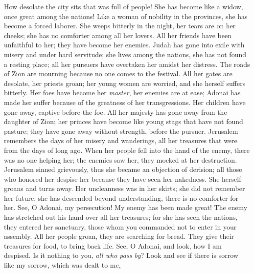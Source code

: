 
\begin{biblechapter} %
 How desolate the city sits 
that was full of people! 
She has become like a widow, 
once great among the nations! 
Like a woman of nobility in the provinces, 
she has become a forced laborer.
\verse She weeps bitterly in the night, 
her tears are on her cheeks; 
she has no comforter 
among all her lovers. 
All her friends have been unfaithful to her; 
they have become her enemies.
\verse Judah has gone into exile with misery 
and under hard servitude; 
she lives among the nations, 
she has not found a resting place; 
all her pursuers have overtaken her 
amidst her distress.
\verse The roads of Zion are mourning 
because no one comes to the festival. 
All her gates are desolate, 
her priests groan; 
her young women are worried, 
and she herself suffers bitterly.
\verse Her foes have become her \textit{master}, 
her enemies are at ease; 
Adonai has made her suffer 
because of the greatness of her transgressions. 
Her children have gone away, 
captive before the foe.
\verse All her majesty has gone away 
from the daughter of Zion; 
her princes have become like young stags 
that have not found pasture; 
they have gone away without strength, 
before the pursuer.
\verse Jerusalem remembers 
the days of her misery and wanderings, 
all her treasures 
that were from the days of long ago. 
When her people fell into the hand of the enemy, 
there was no one helping her; 
the enemies saw her, they mocked 
at her destruction.
\verse Jerusalem sinned grievously, 
thus she became an objection of derision; 
all those who honored her despise her 
because they have seen her nakedness. 
She herself groans 
and turns away.
\verse Her uncleanness was in her skirts; 
she did not remember her future, 
she has descended beyond understanding, 
there is no comforter for her. 
See, O Adonai, my persecution! 
My enemy has been made great!
\verse The enemy has stretched out his hand 
over all her treasures; 
for she has seen the nations, 
they entered her sanctuary, 
those whom you commanded not to enter 
in your assembly.
\verse All her people groan, 
they are searching for bread. 
They give their treasures for food, 
to bring back life. 
See, O Adonai, and look, 
how I am despised.
\verse Is it nothing to you, \textit{all who pass by}? 
Look and see 
if there is sorrow like my sorrow, 
which was dealt to me, 

\end{biblechapter}
